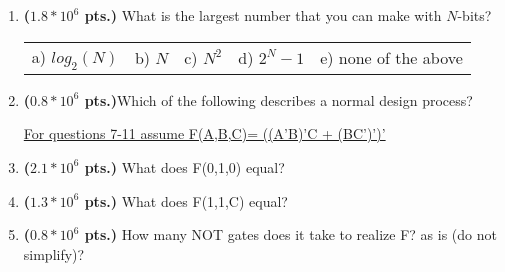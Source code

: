 \documentclass{article}
\begin{document}
\begin{enumerate}
\item {\bf ($1.8*10^6$ pts.)} What is the largest number that you can make with $N$-bits?

\begin{tabular}{p{0.7in} p{0.7in} p{0.7in} p{0.7in} l}
a) $log_2(N)$ & b) $N$ & c) $N^2$ & d) $2^N-1$ & e) none of the above
\end{tabular}

\item {\bf ($0.8*10^6$ pts.)}Which of the following describes a normal
design process?

\pagebreak

\underline{For questions 7-11 assume F(A,B,C)= ((A'B)'C + (BC')')' }

\item {\bf ($2.1*10^6$ pts.)} What does F(0,1,0) equal?

\item {\bf ($1.3*10^6$ pts.)} What does F(1,1,C) equal?

\item {\bf ($0.8*10^6$ pts.)} How many NOT gates does it take to realize F?
as is (do not simplify)?


\end{enumerate}
\end{document}
